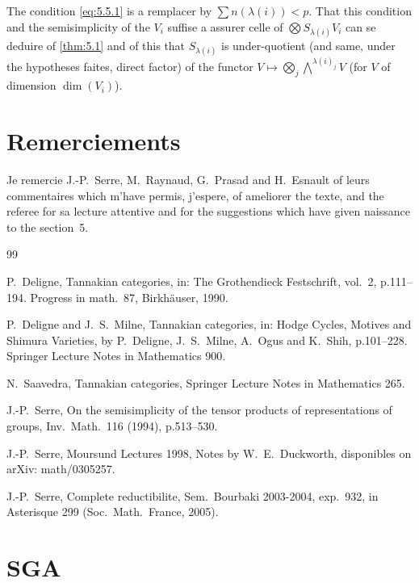 \documentclass[11pt,a4paper]{article}
\theoremstyle{plain}
\theoremstyle{definition}
\begin{document}
The condition \eqref{eq:5.5.1} is a remplacer by $\sum n(\lambda(i)) < p$. That this condition and the semisimplicity of the $V_i$ suffise a assurer celle of $\bigotimes S_{\lambda(i)} V_i$ can se deduire of \ref{thm:5.1} and of this that $S_{\lambda(i)}$ is under-quotient (and same, under the hypotheses faites, direct factor) of the functor $V \mapsto \bigotimes_j \bigwedge^{\lambda(i)_j} V$ (for $V$ of dimension $\dim(V_i)$).

\section*{Remerciements}

Je remercie J.-P.\ Serre, M.\ Raynaud, G.\ Prasad and H.\ Esnault of leurs commentaires which m'have permis, j'espere, of ameliorer the texte, and the referee for sa lecture attentive and for the suggestions which have given naissance to the section~5.

\begin{thebibliography}{99}

P.\ Deligne, Tannakian categories, in: The Grothendieck Festschrift, vol.~2, p.111--194. Progress in math.~87, Birkh\"auser, 1990.

P.\ Deligne and J.\ S.\ Milne, Tannakian categories, in: Hodge Cycles, Motives and Shimura Varieties, by P.\ Deligne, J.\ S.\ Milne, A.\ Ogus and K.\ Shih, p.101--228. Springer Lecture Notes in Mathematics 900.

N.\ Saavedra, Tannakian categories, Springer Lecture Notes in Mathematics 265.

J.-P.\ Serre, On the semisimplicity of the tensor products of representations of groups, Inv.\ Math.\ 116 (1994), p.513--530.

J.-P.\ Serre, Moursund Lectures 1998, Notes by W.\ E.\ Duckworth, disponibles on arXiv: math/0305257.

J.-P.\ Serre, Complete reductibilite, Sem.\ Bourbaki 2003-2004, exp.~932, in Asterisque 299 (Soc.\ Math.\ France, 2005).

\end{thebibliography}

\section*{SGA}
\end{document}

